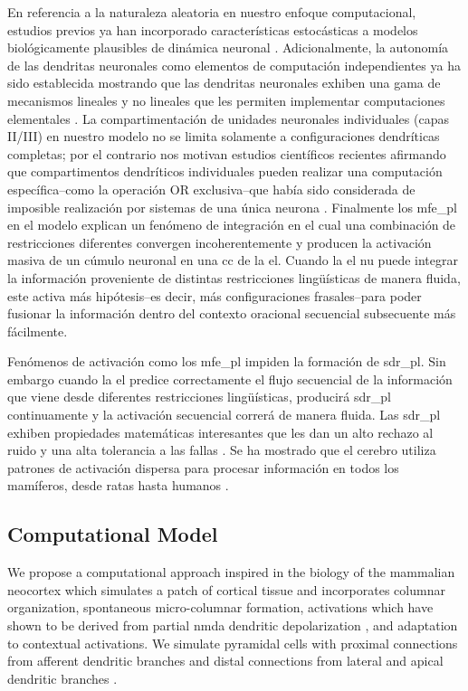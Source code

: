 {En referencia a la naturaleza aleatoria en nuestro enfoque computacional, estudios previos ya han incorporado características estocásticas a modelos biológicamente plausibles de dinámica neuronal \cite{harrison_l.m_stochastic_2005}.
Adicionalmente, la autonomía de las dendritas neuronales como elementos de computación independientes ya ha sido establecida mostrando que las dendritas neuronales exhiben una gama de mecanismos lineales y no lineales que les permiten implementar computaciones elementales \cite{poirazi_dendritic_2015, PAYEUR201978}.
La compartimentación de unidades neuronales individuales (capas II/III) en nuestro modelo no se limita solamente a configuraciones dendríticas completas; por el contrario nos motivan estudios científicos recientes afirmando que compartimentos dendríticos individuales pueden realizar una computación específica--como la operación OR exclusiva--que había sido considerada de imposible realización por sistemas de una única neurona \cite{Gidon83}.
Finalmente los \gls{mfe_pl} en el modelo explican un fenómeno de integración en el cual una combinación de restricciones diferentes convergen incoherentemente y producen la activación masiva de un cúmulo neuronal en una \gls{cc} de la \gls{el}.
Cuando la \gls{el} nu puede integrar la información proveniente de distintas restricciones lingüísticas de manera fluida, este activa más hipótesis--es decir, más configuraciones frasales--para poder fusionar la información dentro del contexto oracional secuencial subsecuente más fácilmente. 

Fenómenos de activación como los \gls{mfe_pl} impiden la formación de \gls{sdr_pl}. Sin embargo cuando la \gls{el} predice correctamente el flujo secuencial de la información que viene desde diferentes restricciones lingüísticas, producirá \gls{sdr_pl} continuamente y la activación secuencial correrá de manera fluida.
Las \gls{sdr_pl} exhiben propiedades matemáticas interesantes que les dan un alto rechazo al ruido y una alta tolerancia a las fallas \cite{DBLP:journals/corr/AhmadH15}.
Se ha mostrado que el cerebro utiliza patrones de activación dispersa para procesar información en todos los mamíferos, desde ratas hasta humanos \cite{barth_experimental_2012}.
}{
\subsection{Computational Model}

We propose a computational approach inspired in the biology of the mammalian neocortex which simulates a patch of cortical tissue and incorporates columnar organization, spontaneous micro-columnar formation,  activations which have shown to be derived from partial \gls{nmda} dendritic depolarization \cite{Antic2010TheDO,Major2013ActivePO,10.3389/fncir.2016.00023}, and adaptation to contextual activations. We simulate pyramidal cells with proximal connections from afferent dendritic branches and distal connections from lateral and apical dendritic branches \cite{10.1371/journal.pone.0217966}.

}
